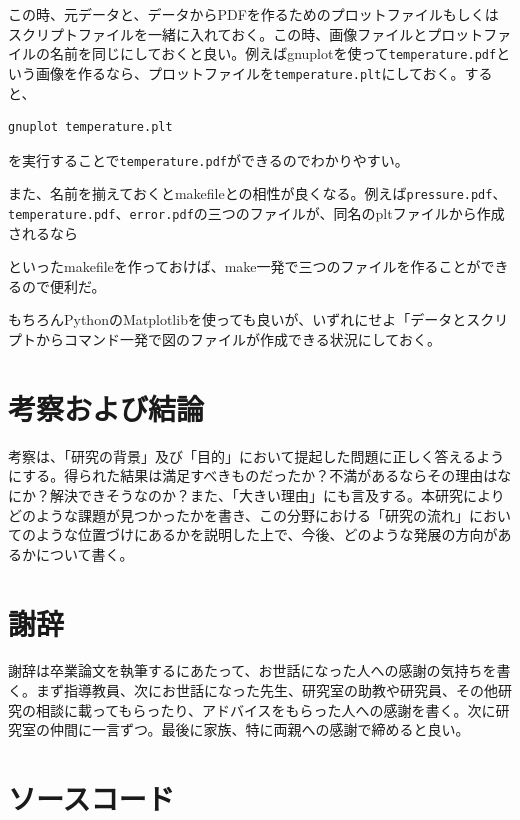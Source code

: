 \documentclass[titlepage]{jsreport}
\begin{document}
この時、元データと、データからPDFを作るためのプロットファイルもしくはスクリプトファイルを一緒に入れておく。この時、画像ファイルとプロットファイルの名前を同じにしておくと良い。例えばgnuplotを使って\verb|temperature.pdf|という画像を作るなら、プロットファイルを\verb|temperature.plt|にしておく。すると、

\begin{lstlisting}[language=bash]
gnuplot temperature.plt
\end{lstlisting}

を実行することで\verb|temperature.pdf|ができるのでわかりやすい。

また、名前を揃えておくとmakefileとの相性が良くなる。例えば\verb|pressure.pdf|、\verb|temperature.pdf|、\verb|error.pdf|の三つのファイルが、同名のpltファイルから作成されるなら



といったmakefileを作っておけば、make一発で三つのファイルを作ることができるので便利だ。

もちろんPythonのMatplotlibを使っても良いが、いずれにせよ「データとスクリプトからコマンド一発で図のファイルが作成できる状況にしておく。

\chapter{考察および結論} \label{chap:summary}

考察は、「研究の背景」及び「目的」において提起した問題に正しく答えるようにする。得られた結果は満足すべきものだったか？不満があるならその理由はなにか？解決できそうなのか？また、「大きい理由」にも言及する。本研究によりどのような課題が見つかったかを書き、この分野における「研究の流れ」においてのような位置づけにあるかを説明した上で、今後、どのような発展の方向があるかについて書く。

\chapter*{謝辞}

謝辞は卒業論文を執筆するにあたって、お世話になった人への感謝の気持ちを書く。まず指導教員、次にお世話になった先生、研究室の助教や研究員、その他研究の相談に載ってもらったり、アドバイスをもらった人への感謝を書く。次に研究室の仲間に一言ずつ。最後に家族、特に両親への感謝で締めると良い。

\appendix

\chapter{ソースコード}





\end{document}
